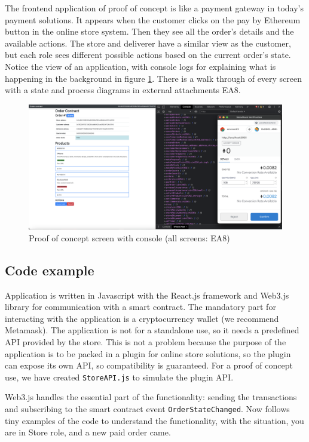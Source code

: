 \documentclass[thesis=M,english]{FITthesis}[2019/12/23]
\begin{document}
The frontend application of proof of concept is like a payment gateway in today's payment solutions. It appears when the customer clicks on the pay by Ethereum button in the online store system. Then they see all the order's details and the available actions. 
The store and deliverer have a similar view as the customer, but each role sees different possible actions based on the current order's state. Notice the view of an application, with console logs for explaining what is happening in the background in figure \ref{fig:screenProofOfConcept}. There is a walk through of every screen with a state and process diagrams in external attachments EA8.

\begin{figure}[ht!]
    \centering
    \includegraphics[width=\textwidth]{assets/Screenshot 2021-04-17 at 16.10.29.png}
    \caption{Proof of concept screen with console (all screens: EA8) }
    \label{fig:screenProofOfConcept}
\end{figure}


\subsection{Code example}

Application is written in Javascript with the React.js framework and Web3.js library for communication with a smart contract. The mandatory part for interacting with the application is a cryptocurrency wallet (we recommend Metamask). The application is not for a standalone use, so it needs a predefined API provided by the store. This is not a problem because the purpose of the application is to be packed in a plugin for online store solutions, so the plugin can expose its own API, so compatibility is guaranteed. For a proof of concept use, we have created \texttt{StoreAPI.js} to simulate the plugin API.

Web3.js handles the essential part of the functionality: sending the transactions and subscribing to the smart contract event \texttt{OrderStateChanged}. Now follows tiny examples of the code to understand the functionality, with the situation, you are in Store role, and a new paid order came. 
\end{document}
